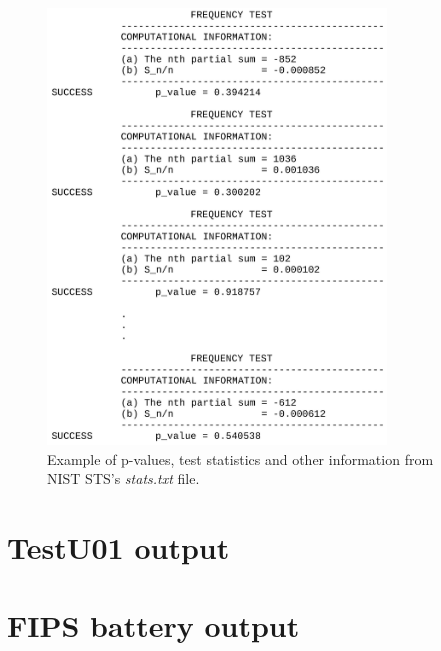 \documentclass[
  digital,     %
  oneside,     %
  nosansbold,  %
  nocolorbold, %
  nolof,         %
  nolot,         %
]{fithesis4}
\begin{document}
\begin{figure}[H]
  \begin{center}
    \includegraphics[width=9cm]{figures/outputs-appendix/stats.jpg}
  \end{center}
  \caption{Example of p-values, test statistics and other information from NIST STS's \emph{stats.txt} file.}
  \label{fig:nist_stats}
\end{figure}

\pagebreak

\section{TestU01 output} \label{append:tu01-output}

\pagebreak

\section{FIPS battery output} \label{append:fips-output}
\end{document}
